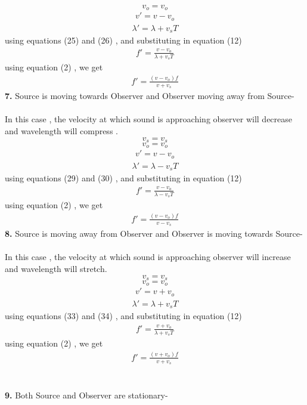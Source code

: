 \documentclass[journal,12pt,twocolumn]{IEEEtran}
\theoremstyle{remark}
\begin{document}
$$v_o = v_o$$
\begin{align}v'= v-v_o\end{align}
\begin{align}\lambda' = \lambda + v_s T\end{align}
using equations (25) and (26) , and substituting in equation (12) 
\begin{align}f' = \frac{v-v_o}{\lambda+v_s T}\end{align}
using equation (2) , we get 
\begin{align}f' = \frac{(v-v_o) f}{v +v_s}\end{align}
\textbf{7.} Source is moving towards Observer and Observer moving away from Source-\\\\
In this case , the velocity at which sound is approaching observer will decrease and wavelength will compress .
$$v_s = v_s$$
$$v_o = v_o$$
\begin{align}v'= v-v_o\end{align}
\begin{align}\lambda' = \lambda - v_s T\end{align}
using equations (29) and (30) , and substituting in equation (12) 
\begin{align}f' = \frac{v-v_o}{\lambda-v_s T}\end{align}
using equation (2) , we get 
\begin{align}f' = \frac{(v-v_o) f}{v -v_s}\end{align}
\textbf{8.} Source is moving away from Observer and Observer is moving towards Source-\\\\
In this case , the velocity at which sound is approaching observer will increase and wavelength will stretch.
$$v_s = v_s$$
$$v_o = v_o$$
\begin{align}v'= v+v_o\end{align}
\begin{align}\lambda' = \lambda + v_s T\end{align}
using equations (33) and (34) , and substituting in equation (12) 
\begin{align}f' = \frac{v+v_o}{\lambda+v_s T}\end{align}
using equation (2) , we get 
\begin{align}f' = \frac{(v+v_o) f}{v +v_s}\end{align}\\\\
\textbf{9.} Both Source and Observer are stationary-\\\\
\end{document}
